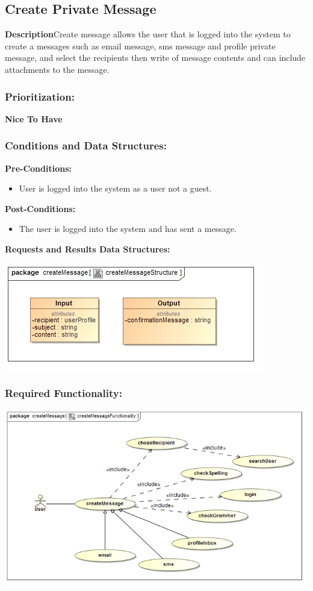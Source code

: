 \documentclass[a4paper,11pt]{article}
\begin{document}
\subsection{Create Private Message}
\textbf{Description}Create message allows the user that is logged into the system to create a messages such as email message, sms message and profile private message, and select the recipients then write of message contents and can include attachments to the message. 
\subsubsection{Prioritization:} 
\textbf{Nice To Have}
\subsubsection{Conditions and Data Structures:}
\textbf{Pre-Conditions:}
\begin{itemize}
\item User is logged into the system as a user not a guest. 
\end{itemize}
\textbf{Post-Conditions:}
\begin{itemize}
\item The user is logged into the system and has sent a message.
\end{itemize}
\textbf{Requests and Results Data Structures:}
\begin{center}
\includegraphics[width=1\linewidth]{./Images/PrivateMessage/createMessageStructure}
\end{center}
\subsubsection{Required Functionality:} 
\includegraphics[width=1\linewidth]{./Images/PrivateMessage/createMessageFunctionality}
\end{document}
